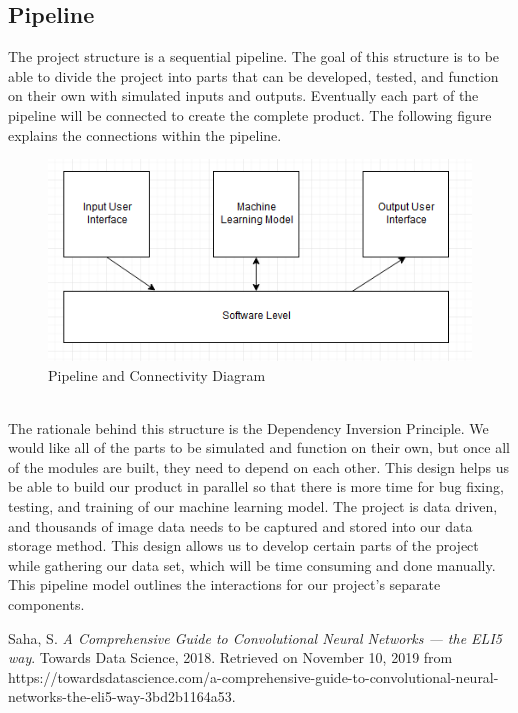 \documentclass[onecolumn, draftclsnofoot,10pt, compsoc]{IEEEtran}
\begin{document}
\subsection{Pipeline}
 The project structure is a sequential pipeline. The goal of this structure is to be able to divide the project into parts that can be developed, tested, and function on their own with simulated inputs and outputs. Eventually each part of the pipeline will be connected to create the complete product. The following figure explains the connections within the pipeline.\\
 \begin{figure}[ht]
    \centering
    \includegraphics[width=.8\textwidth]{pipeline.png}
    \caption{Pipeline and Connectivity Diagram}
    \label{fig:Figure 6}
\end{figure}\\
The rationale behind this structure is the Dependency Inversion Principle. We would like all of the parts to be simulated and function on their own, but once all of the modules are built, they need to depend on each other. This design helps us be able to build our product in parallel so that there is more time for bug fixing, testing, and training of our machine learning model. The project is data driven, and thousands of image data needs to be captured and stored into our data storage method. This design allows us to develop certain parts of the project while gathering our data set, which will be time consuming and done manually. This pipeline model outlines the interactions for our project's separate components.

\newpage
\begin{thebibliography}{9}

Saha, S. 
\textit{A Comprehensive Guide to Convolutional Neural Networks — the ELI5 way}. 
Towards Data Science, 2018. Retrieved on November 10, 2019 from https://towardsdatascience.com/a-comprehensive-guide-to-convolutional-neural-networks-the-eli5-way-3bd2b1164a53.

\end{thebibliography}
\end{document}
